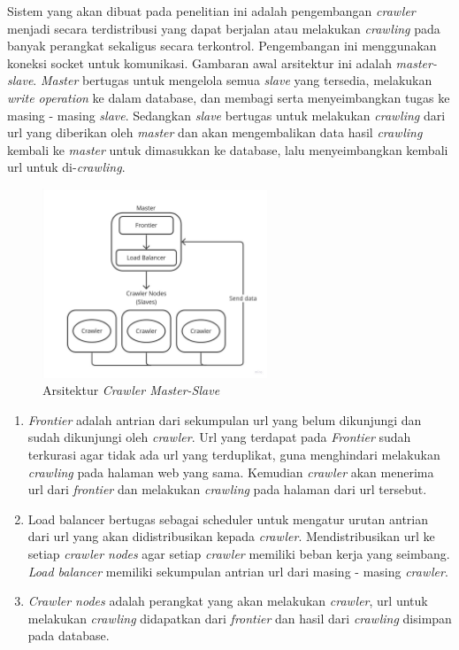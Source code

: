 Sistem yang akan dibuat pada penelitian ini adalah pengembangan \emph{crawler} menjadi secara terdistribusi yang dapat berjalan atau melakukan \emph{crawling} pada banyak perangkat sekaligus secara terkontrol. Pengembangan ini menggunakan koneksi socket untuk komunikasi. Gambaran awal arsitektur ini adalah \emph{master-slave}. \emph{Master} bertugas untuk mengelola semua \emph{slave} yang tersedia, melakukan \emph{write operation} ke dalam database, dan membagi serta menyeimbangkan tugas ke masing - masing \emph{slave}. Sedangkan \emph{slave} bertugas untuk melakukan \emph{crawling} dari url yang diberikan oleh \emph{master} dan akan mengembalikan data hasil \emph{crawling} kembali ke \emph{master} untuk dimasukkan ke database, lalu menyeimbangkan kembali url untuk di-\emph{crawling}.

\begin{figure}[H]
  \centering{}
	\includegraphics[width=0.6\textwidth]{gambar/crawler_master_slave}
  \caption{Arsitektur \emph{Crawler Master-Slave}}
\end{figure}

\begin{enumerate}
  \item{\emph{Frontier} adalah antrian dari sekumpulan url yang belum dikunjungi dan sudah dikunjungi oleh \emph{crawler}. Url yang terdapat pada \emph{Frontier} sudah terkurasi agar tidak ada url yang terduplikat, guna menghindari melakukan \emph{crawling} pada halaman web yang sama. Kemudian \emph{crawler} akan menerima url dari \emph{frontier} dan melakukan \emph{crawling} pada halaman dari url tersebut.}

  \item{Load balancer bertugas sebagai scheduler untuk mengatur urutan antrian dari url yang akan didistribusikan kepada \emph{crawler}. Mendistribusikan url ke setiap \emph{crawler nodes} agar setiap \emph{crawler} memiliki beban kerja yang seimbang. \emph{Load balancer} memiliki sekumpulan antrian url dari masing - masing \emph{crawler}.}

  \item{\emph{Crawler nodes} adalah perangkat yang akan melakukan \emph{crawler}, url untuk melakukan \emph{crawling} didapatkan dari \emph{frontier} dan hasil dari \emph{crawling} disimpan pada database.}
\end{enumerate}

